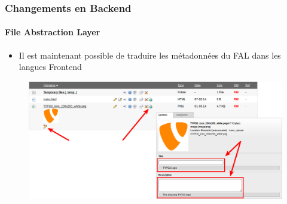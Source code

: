 
\begin{frame}[fragile]
	\frametitle{Changements en Backend}
	\framesubtitle{File Abstraction Layer}

	\begin{itemize}
		\item Il est maintenant possible de traduire les métadonnées du FAL dans\newline
				les langues Frontend
	\end{itemize}

	\begin{figure}
		\includegraphics[width=0.95\linewidth]{Images/BackendChanges/FalTranslateMetaData.png}
	\end{figure}

\end{frame}


